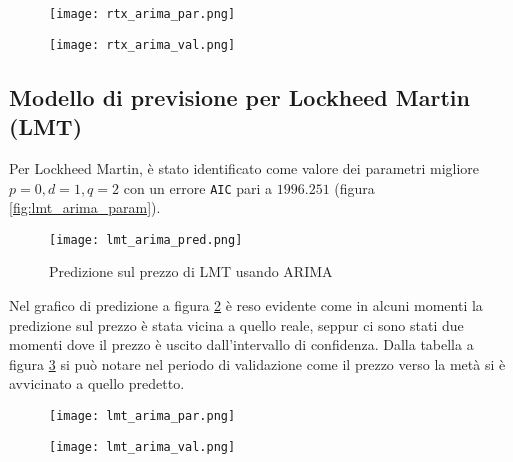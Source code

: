 \begin{figure}[ht]
    \centering
    \begin{minipage}{.5\textwidth}
        \centering
        \vspace{2.4cm}
        \texttt{[image: rtx\_arima\_par.png]}
        \label{fig:rtx_arima_param}
    \end{minipage}%
    \begin{minipage}{.5\textwidth}
        \centering
        \texttt{[image: rtx\_arima\_val.png]}
        \label{fig:rtx_arima_val}
    \end{minipage}
\end{figure}

\pagebreak

\subsection{Modello di previsione per Lockheed Martin (LMT)}

Per Lockheed Martin, è stato identificato come valore dei parametri migliore \(p=0, d=1, q=2\) con un errore \verb|AIC| pari a \(1996.251\) (figura \ref{fig:lmt_arima_param}).

\begin{figure}[ht]
    \centering
    \texttt{[image: lmt\_arima\_pred.png]}
    \caption{Predizione sul prezzo di LMT usando ARIMA}
    \label{fig:lmt_arima_pred}
\end{figure}

Nel grafico di predizione a figura \ref{fig:lmt_arima_pred} è reso evidente come in alcuni momenti la predizione sul prezzo è stata vicina a quello reale, seppur ci sono stati due momenti dove il prezzo è uscito
dall'intervallo di confidenza.
Dalla tabella a figura \ref{fig:lmt_arima_val} si può notare nel periodo di validazione come il prezzo verso la metà si è avvicinato a quello predetto.

\begin{figure}[ht]
    \centering
    \begin{minipage}{.5\textwidth}
        \centering
        \vspace{2.21cm}
        \texttt{[image: lmt\_arima\_par.png]}
        \label{fig:lmt_arima_param}
    \end{minipage}%
    \begin{minipage}{.5\textwidth}
        \centering
        \texttt{[image: lmt\_arima\_val.png]}
        \label{fig:lmt_arima_val}
    \end{minipage}
\end{figure}

